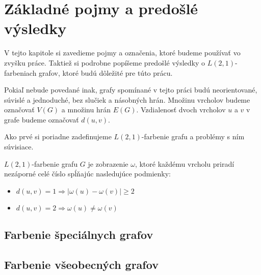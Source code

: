 \chapter{Základné pojmy a predošlé výsledky}

V tejto kapitole si zavedieme pojmy a označenia, ktoré budeme používať
vo zvyšku práce. Taktiež si podrobne popíšeme predošlé výsledky o
$L(2,1)$-farbeniach grafov, ktoré budú dôležité pre túto prácu.

Pokiaľ nebude povedané inak, grafy spomínané v tejto práci budú neorientované,
súvislé a jednoduché, bez slučiek a násobných hrán. Množinu vrcholov budeme
označovať $V(G)$ a množinu hrán $E(G)$. Vzdialenosť dvoch
vrcholov $u$ a $v$ v grafe budeme označovať $d(u,v)$.

Ako prvé si poriadne
zadefinujeme $L(2,1)$-farbenie grafu a problémy s ním súvisiace.

\begin{defn}
$L(2,1)$-farbenie grafu $G$ je zobrazenie $\omega$, ktoré každému vrcholu priradí
nezáporné celé číslo spĺňajúc nasledujúce podmienky:

\begin{itemize}
\item $d(u, v) = 1 \Rightarrow \left| \omega(u) - \omega(v) \right| \ge 2$
\item $d(u, v) = 2 \Rightarrow \omega(u) \neq \omega(v)$
\end{itemize}
\end{defn}




\section{Farbenie špeciálnych grafov}



\section{Farbenie všeobecných grafov}
